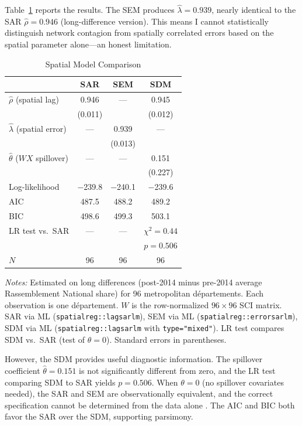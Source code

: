\documentclass[12pt]{article}
\newcommand{\rn}{Rassemblement National}
\newcommand{\dept}{d\'{e}partement}
\newcommand{\depts}{d\'{e}partements}
\begin{document}
Table~\ref{tab:spatial} reports the results. The SEM produces $\hat{\lambda} = 0.939$, nearly identical to the SAR $\hat{\rho} = 0.946$ (long-difference version). This means I cannot statistically distinguish network contagion from spatially correlated errors based on the spatial parameter alone---an honest limitation.

\begin{table}[H]
\centering
\caption{Spatial Model Comparison}
\label{tab:spatial}
\begin{threeparttable}
\begin{tabular}{@{}lccc@{}}
\toprule
 & SAR & SEM & SDM \\
\midrule
$\hat{\rho}$ (spatial lag) & 0.946 & --- & 0.945 \\
 & (0.011) & & (0.012) \\[2pt]
$\hat{\lambda}$ (spatial error) & --- & 0.939 & --- \\
 & & (0.013) & \\[2pt]
$\hat{\theta}$ ($WX$ spillover) & --- & --- & 0.151 \\
 & & & (0.227) \\[3pt]
Log-likelihood & $-$239.8 & $-$240.1 & $-$239.6 \\
AIC & 487.5 & 488.2 & 489.2 \\
BIC & 498.6 & 499.3 & 503.1 \\[3pt]
LR test vs.\ SAR & --- & --- & $\chi^2 = 0.44$ \\
 & & & $p = 0.506$ \\[3pt]
$N$ & 96 & 96 & 96 \\
\bottomrule
\end{tabular}
\begin{tablenotes}
\small
\item \textit{Notes:} Estimated on long differences (post-2014 minus pre-2014 average \rn{} share) for 96 metropolitan \depts{}. Each observation is one \dept{}. $W$ is the row-normalized $96 \times 96$ SCI matrix. SAR via ML (\texttt{spatialreg::lagsarlm}), SEM via ML (\texttt{spatialreg::errorsarlm}), SDM via ML (\texttt{spatialreg::lagsarlm} with \texttt{type="mixed"}). LR test compares SDM vs.\ SAR (test of $\theta = 0$). Standard errors in parentheses.
\end{tablenotes}
\end{threeparttable}
\end{table}

However, the SDM provides useful diagnostic information. The spillover coefficient $\hat{\theta} = 0.151$ is not significantly different from zero, and the LR test comparing SDM to SAR yields $p = 0.506$. When $\theta = 0$ (no spillover covariates needed), the SAR and SEM are observationally equivalent, and the correct specification cannot be determined from the data alone \citep{lesage2009introduction}. The AIC and BIC both favor the SAR over the SDM, supporting parsimony.
\end{document}
